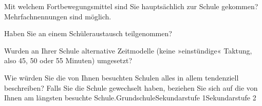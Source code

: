\vspace{-.15cm}
\separate
\vspace{-.15cm}

\begin{choicegroup}{Mit welchem Fortbewegungsmittel sind Sie hauptsächlich zur Schule gekommen?
\newline\footnotesize{Mehrfachnennungen sind möglich.}}

\end{choicegroup}

\vspace{-.15cm}
\separate
\vspace{-.15cm}

\begin{choicequestion}[1]{Haben Sie an einem Schüleraustausch teilgenommen?}
\end{choicequestion}

\vspace{-.15cm}
\separate
\vspace{-.15cm}

\begin{choicequestion}[1]{Wurden an Ihrer Schule alternative Zeitmodelle (keine »einstündige« Taktung, also 45, 50 oder 55 Minuten) umgesetzt?}
\end{choicequestion}

\vspace{-.15cm}
\separate
\vspace{-.15cm}

\begin{markgroupThree}{Wie würden Sie die von Ihnen besuchten Schulen alles in allem tendenziell beschreiben?
	\newline\footnotesize Falls Sie die Schule gewechselt haben, beziehen Sie sich auf die von Ihnen am längsten besuchte Schule.}{Grundschule}{Sekundarstufe 1}{Sekundarstufe 2}
\end{markgroupThree}%

